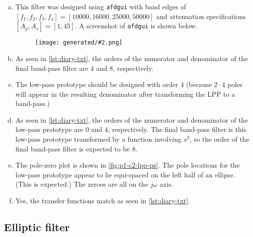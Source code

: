 \documentclass{ajhlabreport}
\newcommand{\generatedfigw}[2]{
	\texttt{[image: generated/\#2.png]}
}
\begin{document}
\begin{enumerate}[(a)]
%
\item This filter was designed using \texttt{afdgui} with band edges of $[ f_1,
f_2, f_3, f_4 ] = [ 10000, 16000, 25000, 50000 ]$ and attenuation specifications
$[ A_p, A_s ] = [ 1, 45 ]$. A screenshot of \texttt{afdgui} is shown below.
\begin{figure}[H]\centering\generatedfigw{0.8}{p1a-c2}\end{figure}
%
\item As seen in \autoref{lst:diary-txt}, the orders of the numerator and
denominator of the final band-pass filter are $4$ and $8$, respectively.
%
\item The low-pass prototype should be designed with order $4$ (because $2 \cdot
4$ poles will appear in the resulting denominator after transforming the LPP to
a band-pass.)
%
\item As seen in \autoref{lst:diary-txt}, the orders of the numerator and
denominator of the low-pass prototype are $0$ and $4$, respectively. The final
band-pass filter is this low-pass prototype transformed by a function involving
$s^2$, so the order of the final band-pass filter is expected to be $8$.
%
\item The pole-zero plot is shown in \autoref{fig:p1-c2-lpp-pz}. The pole
locations for the low-pass prototype appear to lie equi-spaced on the left half
of an ellipse. (This is expected.) The zeroes are all on the $j\omega$ axis.
%
\setcounter{enumi}{6}
\item Yes, the transfer functions match as seen in \autoref{lst:diary-txt}.
%
\end{enumerate}


\newpage
\subsection{Elliptic filter}%
\end{document}
